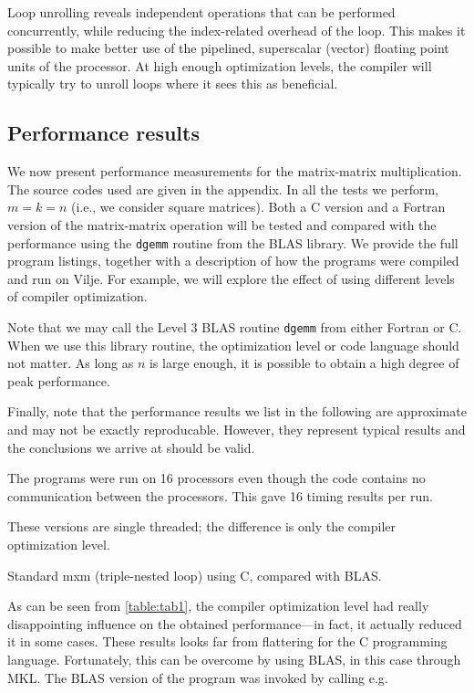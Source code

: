 Loop unrolling reveals independent operations that can be performed
concurrently, while reducing the index-related overhead of the loop. This makes
it possible to make better use of the pipelined, superscalar (vector) floating
point units of the processor. At high enough optimization levels, the compiler
will typically try to unroll loops where it sees this as beneficial.

\subsection{Performance results}

We now present performance measurements for the matrix-matrix multiplication.
The source codes used are given in the appendix. In all the tests we perform,
$m=k=n$ (i.e., we consider square matrices). Both a C version and a Fortran
version of the matrix-matrix operation will be tested and compared with the
performance using the \texttt{dgemm} routine from the BLAS library. We provide
the full program listings, together with a description of how the programs were
compiled and run on Vilje. For example, we will explore the effect of using
different levels of compiler optimization.

Note that we may call the Level 3 BLAS routine \texttt{dgemm} from either
Fortran or C. When we use this library routine, the optimization level or code
language should not matter. As long as $n$ is large enough, it is possible to
obtain a high degree of peak performance.

Finally, note that the performance results we list in the following are
approximate and may not be exactly reproducable. However, they represent typical
results and the conclusions we arrive at should be valid.

The programs were run on 16 processors even though the code contains no
communication between the processors. This gave 16 timing results per run.

These versions are single threaded; the difference is only the compiler
optimization level.

\begin{table}
  \caption{Standard mxm (triple-nested loop) using C, compared with BLAS.}
  \label{table:tab1}
  
\end{table}

As can be seen from \autoref{table:tab1}, the compiler optimization level had
really disappointing influence on the obtained performance---in fact, it
actually reduced it in some cases. These results looks far from flattering for
the C programming language. Fortunately, this can be overcome by using BLAS, in
this case through MKL. The BLAS version of the program was invoked by calling
e.g.

